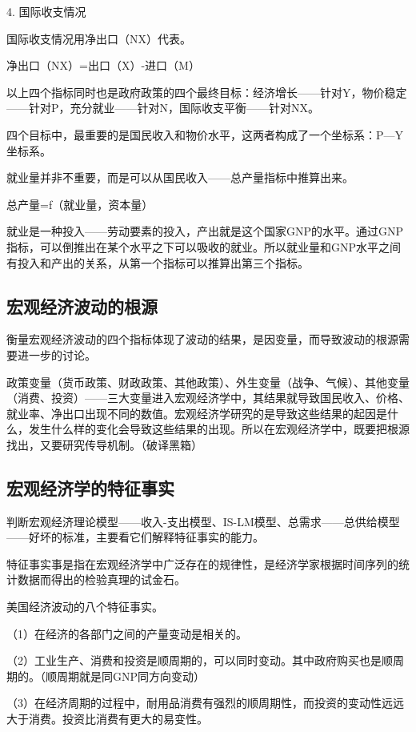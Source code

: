 \documentclass{article}
\begin{document}
4. 国际收支情况

国际收支情况用净出口（NX）代表。

净出口（NX）=出口（X）-进口（M）

\hspace*{\fill}

以上四个指标同时也是政府政策的四个最终目标：经济增长——针对Y，物价稳定——针对P，充分就业——针对N，国际收支平衡——针对NX。

四个目标中，最重要的是国民收入和物价水平，这两者构成了一个坐标系：P—Y坐标系。

就业量并非不重要，而是可以从国民收入——总产量指标中推算出来。

总产量=f（就业量，资本量）

就业是一种投入——劳动要素的投入，产出就是这个国家GNP的水平。通过GNP指标，可以倒推出在某个水平之下可以吸收的就业。所以就业量和GNP水平之间有投入和产出的关系，从第一个指标可以推算出第三个指标。

\subsection{宏观经济波动的根源}
衡量宏观经济波动的四个指标体现了波动的结果，是因变量，而导致波动的根源需要进一步的讨论。

政策变量（货币政策、财政政策、其他政策）、外生变量（战争、气候）、其他变量（消费、投资）——三大变量进入宏观经济学中，其结果就导致国民收入、价格、就业率、净出口出现不同的数值。宏观经济学研究的是导致这些结果的起因是什么，发生什么样的变化会导致这些结果的出现。所以在宏观经济学中，既要把根源找出，又要研究传导机制。（破译黑箱）

\subsection{宏观经济学的特征事实}
判断宏观经济理论模型——收入-支出模型、IS-LM模型、总需求——总供给模型——好坏的标准，主要看它们解释特征事实的能力。

特征事实事是指在宏观经济学中广泛存在的规律性，是经济学家根据时间序列的统计数据而得出的检验真理的试金石。

美国经济波动的八个特征事实。

（1）在经济的各部门之间的产量变动是相关的。

（2）工业生产、消费和投资是顺周期的，可以同时变动。其中政府购买也是顺周期的。（顺周期就是同GNP同方向变动）

（3）在经济周期的过程中，耐用品消费有强烈的顺周期性，而投资的变动性远远大于消费。投资比消费有更大的易变性。
\end{document}
